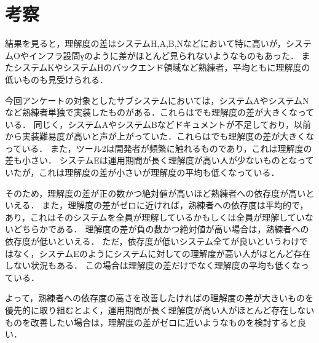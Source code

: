 \section{考察}

結果を見ると，理解度の差はシステムH,A,B,Nなどにおいて特に高いが，システムOやインフラ設問γのように差がほとんど見られないようなものもあった．
またシステムKやシステムHのバックエンド領域など熟練者，平均ともに理解度の低いものも見受けられる．

今回アンケートの対象としたサブシステムにおいては，システムAやシステムNなど熟練者単独で実装したものがある．これらはでも理解度の差が大きくなっている．
同じく，システムAやシステムBなどドキュメントが不足しており，以前から実装難易度が高いと声が上がっていた．これらはでも理解度の差が大きくなっている．
また，ツール2は開発者が頻繁に触れるものであり，これは理解度の差も小さい．
システムEは運用期間が長く理解度が高い人が少ないものとなっていたが，これは理解度の差が小さいが理解度の平均も低くなっている．

そのため，理解度の差が正の数かつ絶対値が高いほど熟練者への依存度が高いといえる．
また，理解度の差がゼロに近ければ，熟練者への依存度は平均的で，あり，これはそのシステムを全員が理解しているかもしくは全員が理解していないどちらかである．
理解度の差が負の数かつ絶対値が高い場合は，熟練者への依存度が低いといえる．
ただ，依存度が低いシステム全てが良いというわけではなく，システムEのようにシステムに対しての理解度が高い人がほとんど存在しない状況もある．
この場合は理解度の差だけでなく理解度の平均も低くなっている．

よって，熟練者への依存度の高さを改善したければの理解度の差が大きいものを優先的に取り組むとよく，運用期間が長く理解度が高い人がほとんど存在しないものを改善したい場合は，理解度の差がゼロに近いようなものを検討すると良い．
